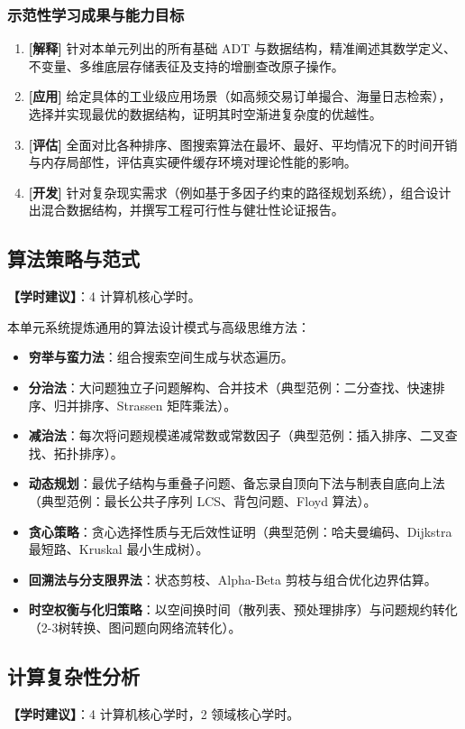 \subsubsection{示范性学习成果与能力目标}
\begin{enumerate}
    \item \textbf{[解释]} 针对本单元列出的所有基础 ADT 与数据结构，精准阐述其数学定义、不变量、多维底层存储表征及支持的增删查改原子操作。
    \item \textbf{[应用]} 给定具体的工业级应用场景（如高频交易订单撮合、海量日志检索），选择并实现最优的数据结构，证明其时空渐进复杂度的优越性。
    \item \textbf{[评估]} 全面对比各种排序、图搜索算法在最坏、最好、平均情况下的时间开销与内存局部性，评估真实硬件缓存环境对理论性能的影响。
    \item \textbf{[开发]} 针对复杂现实需求（例如基于多因子约束的路径规划系统），组合设计出混合数据结构，并撰写工程可行性与健壮性论证报告。
\end{enumerate}

\subsection{算法策略与范式}
\textbf{【学时建议】}：4 计算机核心学时。

本单元系统提炼通用的算法设计模式与高级思维方法：
\begin{itemize}
    \item \textbf{穷举与蛮力法}：组合搜索空间生成与状态遍历。
    \item \textbf{分治法}：大问题独立子问题解构、合并技术（典型范例：二分查找、快速排序、归并排序、Strassen 矩阵乘法）。
    \item \textbf{减治法}：每次将问题规模递减常数或常数因子（典型范例：插入排序、二叉查找、拓扑排序）。
    \item \textbf{动态规划}：最优子结构与重叠子问题、备忘录自顶向下法与制表自底向上法（典型范例：最长公共子序列 LCS、背包问题、Floyd 算法）。
    \item \textbf{贪心策略}：贪心选择性质与无后效性证明（典型范例：哈夫曼编码、Dijkstra 最短路、Kruskal 最小生成树）。
    \item \textbf{回溯法与分支限界法}：状态剪枝、Alpha-Beta 剪枝与组合优化边界估算。
    \item \textbf{时空权衡与化归策略}：以空间换时间（散列表、预处理排序）与问题规约转化（2-3树转换、图问题向网络流转化）。
\end{itemize}

\subsection{计算复杂性分析}
\textbf{【学时建议】}：4 计算机核心学时，2 领域核心学时。

